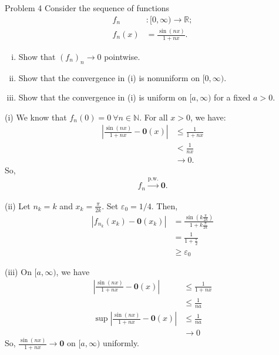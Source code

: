 \documentclass[8pt]{extarticle}
\renewcommand{\mathbf}[1]{\mathbold{#1}}
\newcommand{\N}{\mathbb{N}}
\newcommand{\R}{\mathbb{R}}
\begin{document}
  \begin{problem}{Problem 4}
    Consider the sequence of functions
    \begin{align*}
      f_n&:[0,\infty) \rightarrow \R;\\
      f_n(x) &= \frac{\sin(nx)}{1 + nx}.
    \end{align*}
    \begin{enumerate}[(i)]
      \item Show that $(f_n)_n\rightarrow 0$ pointwise.
      \item Show that the convergence in (i) is nonuniform on $[0,\infty)$.
      \item Show that the convergence in (i) is uniform on $[a,\infty)$ for a fixed $a > 0$.
    \end{enumerate}
    \tcblower
    \begin{problem}{(i)}
      We know that $f_n(0) = 0~\forall n\in\N$. For all $x > 0$, we have:
      \begin{align*}
        \left|\frac{\sin(nx)}{1+nx} - \mathbf{0}(x)\right| &\leq \frac{1}{1 + nx}\\
                                                           &< \frac{1}{nx}\\
                                                           &\rightarrow 0.
      \end{align*}
      So,
      \begin{align*}
        f_n \xrightarrow{\text{p.w.}} \mathbf{0}.
      \end{align*}
    \end{problem}
    \begin{problem}{(ii)}
      Let $n_k = k$ and $x_k = \frac{\pi}{2k}$. Set $\varepsilon_0 = 1/4$. Then,
      \begin{align*}
        \left|f_{n_k}(x_k) - \mathbf{0}(x_k)\right| &= \frac{\sin\left(k\frac{\pi}{2k}\right)}{1 + k\frac{\pi}{2k}}\\
                                                    &= \frac{1}{1 + \frac{\pi}{2}}\\
                                                    &\geq \varepsilon_0
      \end{align*}
    \end{problem}
    \begin{problem}{(iii)}
      On $[a,\infty)$, we have
      \begin{align*}
        \left|\frac{\sin(nx)}{1 + nx} - \mathbf{0}(x)\right| &\leq \frac{1}{1 + nx}\\
                                                             &\leq \frac{1}{na}\\
        \sup\left|\frac{\sin(nx)}{1 + nx} - \mathbf{0}(x)\right| &\leq \frac{1}{na}\\
                                                             &\rightarrow 0
      \end{align*}
      So, $\frac{\sin(nx)}{1 + nx} \rightarrow \mathbf{0}$ on $[a,\infty)$ uniformly.
    \end{problem}
  \end{problem}
\end{document}
